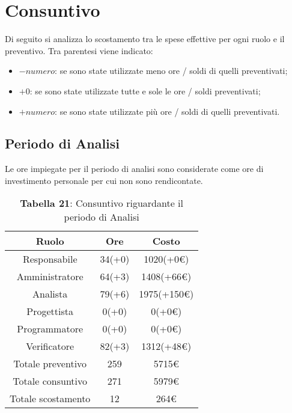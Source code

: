 \section{Consuntivo}
Di seguito si analizza lo scostamento tra le spese effettive per ogni ruolo e il preventivo. Tra parentesi viene indicato:
\begin{itemize}
	\item $-numero$: se sono state utilizzate meno ore / soldi di quelli preventivati;
	\item $+0$: se sono state utilizzate tutte e sole le ore / soldi preventivati;
	\item $+numero$: se sono state utilizzate più ore / soldi di quelli preventivati.
\end{itemize}
\subsection{Periodo di Analisi}
Le ore impiegate per il periodo di analisi sono considerate come ore di investimento personale per cui non sono rendicontate.
\begin{table}[H]
	\centering
	\renewcommand{\arraystretch}{1.5}
	\begin{tabular}{|c|c|c|}
		\hline
		\rowcolor{lighter-grayer}
Ruolo & Ore & Costo \\ \hline
Responsabile & 34(+0) & 1020(+0\euro) \\ \hline
Amministratore & 64(+3) & 1408(+66\euro) \\ \hline
Analista & 79(+6) & 1975(+150\euro) \\ \hline
Progettista & 0(+0) & 0(+0\euro) \\ \hline
Programmatore & 0(+0) & 0(+0\euro) \\ \hline
Verificatore & 82(+3) & 1312(+48\euro) \\ \hline
Totale preventivo & 259 & 5715\euro \\ \hline
Totale consuntivo & 271 & 5979\euro \\ \hline
Totale scostamento & 12 & 264\euro \\ \hline
	\end{tabular}
	\caption*{\textbf{Tabella 21}: Consuntivo riguardante il periodo di Analisi\\}
\end{table}
